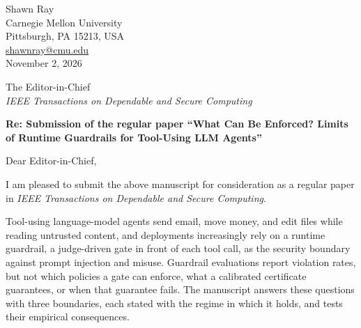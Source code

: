 \documentclass[11pt]{article}
\begin{document}
\begin{flushright}
Shawn Ray\\
Carnegie Mellon University\\
Pittsburgh, PA 15213, USA\\
\href{mailto:shawnray@cmu.edu}{shawnray@cmu.edu}\\[0.6em]
November 2, 2026
\end{flushright}

The Editor-in-Chief\\
\emph{IEEE Transactions on Dependable and Secure Computing}

\textbf{Re: Submission of the regular paper ``What Can Be Enforced? Limits of Runtime
Guardrails for Tool-Using LLM Agents''}

Dear Editor-in-Chief,

I am pleased to submit the above manuscript for consideration as a regular paper in
\emph{IEEE Transactions on Dependable and Secure Computing}.

Tool-using language-model agents send email, move money, and edit files while
reading untrusted content, and deployments increasingly rely on a runtime guardrail,
a judge-driven gate in front of each tool call, as the security boundary against
prompt injection and misuse. Guardrail evaluations report violation rates, but not
which policies a gate can enforce, what a calibrated certificate guarantees, or when
that guarantee fails. The manuscript answers these questions with three boundaries,
each stated with the regime in which it holds, and tests their empirical
consequences.
\end{document}
